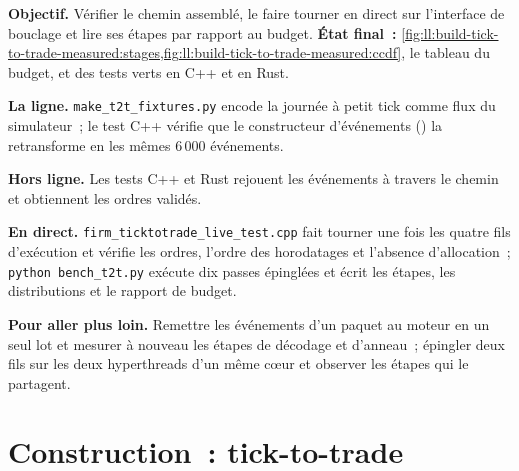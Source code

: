 \begin{tutorial}
\textbf{Objectif.} Vérifier le chemin assemblé, le faire tourner en direct sur l'interface de bouclage et lire ses étapes par rapport au budget.
\textbf{État final~:} \cref{fig:ll:build-tick-to-trade-measured:stages,fig:ll:build-tick-to-trade-measured:ccdf}, le tableau
du budget, et des tests verts en C++ et en Rust.
\begin{tutsteps}
\item \textbf{La ligne.} \texttt{make\_t2t\_fixtures.py} encode la journée à petit tick comme flux du simulateur~; le test C++ vérifie que le
constructeur d'événements () la retransforme en les mêmes 6\,000 événements.
\item \textbf{Hors ligne.} Les tests C++ et Rust rejouent les événements à travers le chemin et obtiennent les ordres validés.
\item \textbf{En direct.} \texttt{firm\_ticktotrade\_live\_test.cpp} fait tourner une fois les quatre fils d'exécution et vérifie les ordres, l'ordre des
horodatages et l'absence d'allocation~; \texttt{python bench\_t2t.py} exécute dix passes épinglées et écrit les étapes, les
distributions et le rapport de budget.
\end{tutsteps}
\textbf{Pour aller plus loin.} Remettre les événements d'un paquet au moteur en un seul lot et mesurer à nouveau les étapes de décodage et d'anneau~;
épingler deux fils sur les deux hyperthreads d'un même cœur et observer les étapes qui le partagent.
\end{tutorial}

\section{Construction~: tick-to-trade}\label{bld:ll:build-tick-to-trade-measured:ticktotrade}

